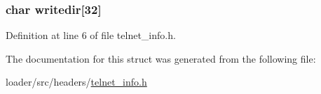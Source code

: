 \subsubsection[{\texorpdfstring{writedir}{writedir}}]{\setlength{\rightskip}{0pt plus 5cm}char writedir\mbox{[}32\mbox{]}}\hypertarget{structtelnet__info_a1386e9a3d64a2f0d4e04206b8929f679}{}\label{structtelnet__info_a1386e9a3d64a2f0d4e04206b8929f679}


Definition at line 6 of file telnet\+\_\+info.\+h.



The documentation for this struct was generated from the following file\+:\begin{DoxyCompactItemize}
\item 
loader/src/headers/\hyperlink{telnet__info_8h}{telnet\+\_\+info.\+h}\end{DoxyCompactItemize}
